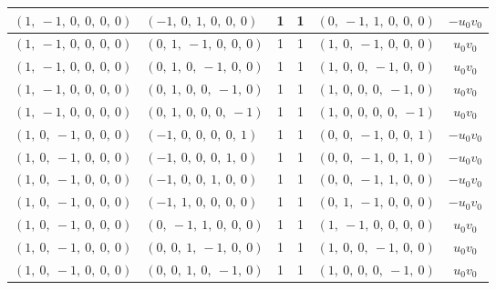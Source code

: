 \documentclass[11pt]{article}
\theoremstyle{definition}
\begin{document}
\begin{longtable}{|l|l|c|c|l|c|}
    \hline
    $\left( 1, \  -1, \  0, \  0, \  0, \  0\right)$ & $\left( -1, \  0, \  1, \  0, \  0, \  0\right)$ & 1 & 1 & $\left( 0, \  -1, \  1, \  0, \  0, \  0\right)$ & $- u_{0} v_{0}$ \\
    \hline
    $\left( 1, \  -1, \  0, \  0, \  0, \  0\right)$ & $\left( 0, \  1, \  -1, \  0, \  0, \  0\right)$ & 1 & 1 & $\left( 1, \  0, \  -1, \  0, \  0, \  0\right)$ & $u_{0} v_{0}$ \\
    \hline
    $\left( 1, \  -1, \  0, \  0, \  0, \  0\right)$ & $\left( 0, \  1, \  0, \  -1, \  0, \  0\right)$ & 1 & 1 & $\left( 1, \  0, \  0, \  -1, \  0, \  0\right)$ & $u_{0} v_{0}$ \\
    \hline
    $\left( 1, \  -1, \  0, \  0, \  0, \  0\right)$ & $\left( 0, \  1, \  0, \  0, \  -1, \  0\right)$ & 1 & 1 & $\left( 1, \  0, \  0, \  0, \  -1, \  0\right)$ & $u_{0} v_{0}$ \\
    \hline
    $\left( 1, \  -1, \  0, \  0, \  0, \  0\right)$ & $\left( 0, \  1, \  0, \  0, \  0, \  -1\right)$ & 1 & 1 & $\left( 1, \  0, \  0, \  0, \  0, \  -1\right)$ & $u_{0} v_{0}$ \\
    \hline
    $\left( 1, \  0, \  -1, \  0, \  0, \  0\right)$ & $\left( -1, \  0, \  0, \  0, \  0, \  1\right)$ & 1 & 1 & $\left( 0, \  0, \  -1, \  0, \  0, \  1\right)$ & $- u_{0} v_{0}$ \\
    \hline
    $\left( 1, \  0, \  -1, \  0, \  0, \  0\right)$ & $\left( -1, \  0, \  0, \  0, \  1, \  0\right)$ & 1 & 1 & $\left( 0, \  0, \  -1, \  0, \  1, \  0\right)$ & $- u_{0} v_{0}$ \\
    \hline
    $\left( 1, \  0, \  -1, \  0, \  0, \  0\right)$ & $\left( -1, \  0, \  0, \  1, \  0, \  0\right)$ & 1 & 1 & $\left( 0, \  0, \  -1, \  1, \  0, \  0\right)$ & $- u_{0} v_{0}$ \\
    \hline
    $\left( 1, \  0, \  -1, \  0, \  0, \  0\right)$ & $\left( -1, \  1, \  0, \  0, \  0, \  0\right)$ & 1 & 1 & $\left( 0, \  1, \  -1, \  0, \  0, \  0\right)$ & $- u_{0} v_{0}$ \\
    \hline
    $\left( 1, \  0, \  -1, \  0, \  0, \  0\right)$ & $\left( 0, \  -1, \  1, \  0, \  0, \  0\right)$ & 1 & 1 & $\left( 1, \  -1, \  0, \  0, \  0, \  0\right)$ & $u_{0} v_{0}$ \\
    \hline
    $\left( 1, \  0, \  -1, \  0, \  0, \  0\right)$ & $\left( 0, \  0, \  1, \  -1, \  0, \  0\right)$ & 1 & 1 & $\left( 1, \  0, \  0, \  -1, \  0, \  0\right)$ & $u_{0} v_{0}$ \\
    \hline
    $\left( 1, \  0, \  -1, \  0, \  0, \  0\right)$ & $\left( 0, \  0, \  1, \  0, \  -1, \  0\right)$ & 1 & 1 & $\left( 1, \  0, \  0, \  0, \  -1, \  0\right)$ & $u_{0} v_{0}$ \\

\end{longtable}
\end{document}
